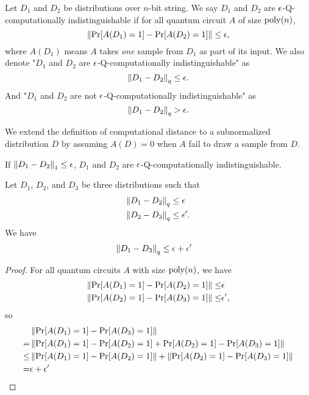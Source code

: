 \begin{definition}
Let  $D_1$ and $D_2$ be distributions over $n$-bit string.  We say $D_1$ and $D_2$  are $\epsilon$-Q-computationally indistinguishable if for all quantum circuit $A$ of size $\operatorname*{\operatorname{poly}}(n)$, $$\left\|\Pr[A({D_1})=1]-\Pr[A({D_2})=1]  \right\| \leq \epsilon,$$  where $A(D_1)$ means $A$ takes \emph{one} sample from $D_1$ as part of its input. We also denote "$D_1$ and $D_2$  are $\epsilon$-Q-computationally indistinguishable" as 
$$ \left\lVert D_1 - D_2\right\rVert_q \leq \epsilon.$$
And "$D_1$ and $D_2$  are not $\epsilon$-Q-computationally indistinguishable" as 
$$ \left\lVert D_1 - D_2\right\rVert_q > \epsilon.$$
\end{definition}

\begin{rmk}
We extend the definition of computational distance to a subnormalized distribution  $D$  by assuming $A(D)=0$ when $A$ fail to draw a sample from $D$.
\end{rmk}

\begin{rmk}\label{rmk:trace-to-comp}
If $\left\lVert D_1-D_2\right\rVert_1\leq \epsilon$, $D_1$ and $D_2$ are $\epsilon$-Q-computationally indistinguishable.
\end{rmk}

\begin{lem} \label{lem:computational-triangle0}
    Let $D_1$, $D_2$, and $D_3$ be three distributions such that 
    \begin{align}
        \left\lVert D_1 -D_2\right\rVert_q &\leq \epsilon \\ 
        \left\lVert D_2 -D_3\right\rVert_q &\leq \epsilon'. 
    \end{align}
    We have 
    \begin{align}
        \left\lVert D_1 -D_3\right\rVert_q &\leq \epsilon+\epsilon'
    \end{align}
\end{lem}
\begin{proof}
For all quantum circuits $A$ with size $\operatorname*{\operatorname{poly}}(n)$, we have 
\begin{align}
    \left\lVert\Pr[A({D_1})=1]-\Pr[A({D_2})=1]\right\rVert \leq& \epsilon \\
    \left\lVert\Pr[A({D_2})=1]-\Pr[A({D_3})=1]\right\rVert \leq& \epsilon',  
\end{align}
so 
\begin{align}
    &\left\lVert\Pr[A({D_1})=1]-\Pr[A({D_3})=1]\right\rVert \nonumber \\
    =& \left\lVert\Pr[A({D_1})=1]-\Pr[A({D_2})=1]+\Pr[A({D_2})=1]-\Pr[A({D_3})=1]\right\rVert \nonumber \\
    \leq&  \left\lVert\Pr[A({D_1})=1]-\Pr[A({D_2})=1]\right\rVert +\left\lVert\Pr[A({D_2})=1]-\Pr[A({D_3})=1]\right\rVert \nonumber \\
    =& \epsilon +\epsilon' \nonumber
\end{align}

\end{proof}


